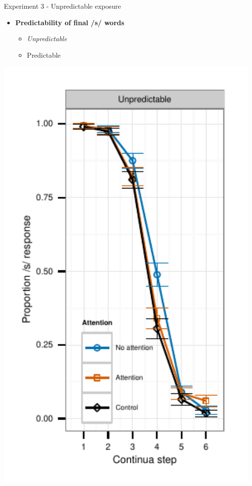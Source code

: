 \documentclass{beamer}
\begin{document}
\begin{frame}{Experiment 3 - Unpredictable exposure}
\begin{minipage}{0.45\textwidth}
\begin{itemize}
\item \textbf{Predictability of final /s/ words}
\begin{itemize}
\item \emph{Unpredictable}
\item Predictable
\end{itemize}
\end{itemize}
\end{minipage}
\hfill
\begin{minipage}{0.4\textwidth}
\includegraphics[width=1.0\textwidth]{graphs/exp3_categresults_present2-unpredictable}
\end{minipage}

\end{frame}
\end{document}
